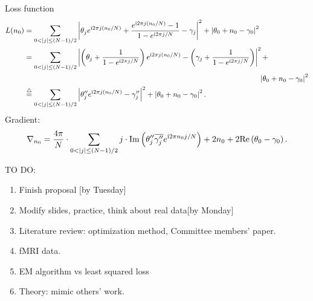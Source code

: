 \noindent
Loss function
\begin{equation*}
		\begin{aligned}\label{eq:aligned distance}
		L(n_0)&=
		\sum_{0<|j|\leq (N-1)/2}
		\left| \theta_{j}e^{\complexunit 2\pi j (n_0/N)}+
		\frac{e^{\complexunit{}2\pi j (n_0/N)}-1}{1-e^{\complexunit{}2\pi j /N}}
		-\gamma_{j} \right|^2
		+ \left| \theta_0+n_0-\gamma_0 \right|^2
		\\
		&=
		\sum_{0<|j|\leq (N-1)/2}
		\left| \left( \theta_{j}+ \frac{1}{1-e^{\complexunit{}2\pi j /N}} \right) e^{\complexunit{}2\pi j (n_0/N)} 
		- \left( \gamma_{j}+\frac{1}{1-e^{\complexunit{}2\pi j /N}} \right)  \right|^2 
		+\\
		&\hspace{11cm} \left| \theta_0+n_0-\gamma_0 \right|^2
		\\
		&\overset{\triangle}{=}
		\sum_{0<|j|\leq (N-1)/2}\left| \theta_{j}'' e^{\complexunit{}2\pi j (n_0/N)} - {\gamma_{j}''}  \right|^2
		+ \left| \theta_0+n_0-\gamma_0 \right|^2
		.
\end{aligned}
\end{equation*}
\noindent
Gradient:
	\begin{equation}
		\begin{split}
		\nabla_{n_0} = \frac{4\pi}{N}\cdot 
		\sum_{0<|j|\leq (N-1)/2} j\cdot 
		\text{Im} \left( {\theta_j''}\overline{{\gamma_j''}}e^{\complexunit2\pi n_0 j/N} \right) 
		+ 2n_0+2 \text{Re}\left( \theta_0-\gamma_0 \right) .
		\end{split}
		\end{equation}





TO DO:
\begin{enumerate}
	\item Finish proposal [by Tuesday]
	\item Modify slides, practice, think about real data[by Monday]
	\item Literature review: optimization method, Committee members' paper.
	\item fMRI data.
	\item EM algorithm vs least squared loss
	\item Theory: mimic others' work. 
	
\end{enumerate}




